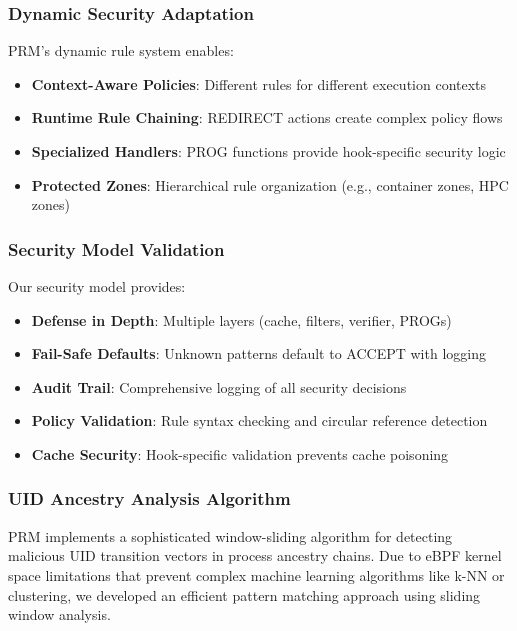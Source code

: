 \documentclass[]{sn-jnl}
\begin{document}
\subsubsection{Dynamic Security Adaptation}

PRM's dynamic rule system enables:
\begin{itemize}
\item \textbf{Context-Aware Policies}: Different rules for different execution
      contexts
\item \textbf{Runtime Rule Chaining}: REDIRECT actions create complex policy flows
\item \textbf{Specialized Handlers}: PROG functions provide hook-specific security
      logic
\item \textbf{Protected Zones}: Hierarchical rule organization (e.g., container
      zones, HPC zones)
\end{itemize}

\subsubsection{Security Model Validation}

Our security model provides:
\begin{itemize}
\item \textbf{Defense in Depth}: Multiple layers (cache, filters, verifier, PROGs)
\item \textbf{Fail-Safe Defaults}: Unknown patterns default to ACCEPT with logging
\item \textbf{Audit Trail}: Comprehensive logging of all security decisions
\item \textbf{Policy Validation}: Rule syntax checking and circular reference
      detection
\item \textbf{Cache Security}: Hook-specific validation prevents cache poisoning
\end{itemize}

\subsubsection{UID Ancestry Analysis Algorithm}

PRM implements a sophisticated window-sliding algorithm for detecting malicious
UID transition vectors in process ancestry chains. Due to eBPF kernel space
limitations that prevent complex machine learning algorithms like k-NN or
clustering, we developed an efficient pattern matching approach using sliding
window analysis.
\end{document}

